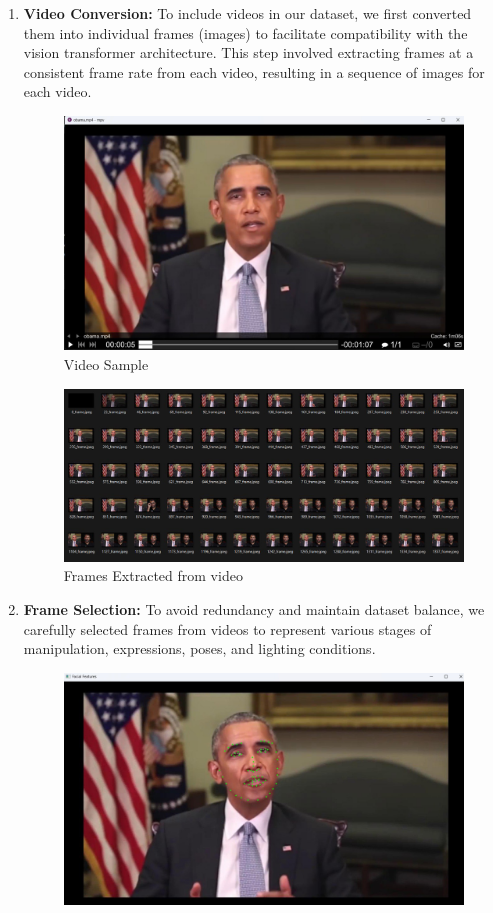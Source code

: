 \begin{enumerate}
    \item \textbf{Video Conversion:} To include videos in our dataset, we first converted them into individual frames (images) to facilitate compatibility with the vision transformer architecture. This step involved extracting frames at a consistent frame rate from each video, resulting in a sequence of images for each video.
          \begin{figure}[htbp]
              \centering
              \includegraphics[width= 5in ]{img/framesExtracted.jpg}
              \caption{Video Sample}
          \end{figure}
          \begin{figure}[ht]
              \centering
              \includegraphics[width= 5in ]{img/frames.jpg}
              \caption{Frames Extracted from video}
          \end{figure}
    \item \textbf{Frame Selection:} To avoid redundancy and maintain dataset balance, we carefully selected frames from videos to represent various stages of manipulation, expressions, poses, and lighting conditions.
          \begin{figure}[htbp]
              \centering
              \includegraphics[width= 5in ]{img/featureshighlight.jpg}

\end{figure}
\end{enumerate}
